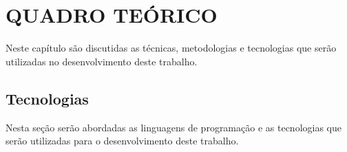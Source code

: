 \chapter{QUADRO TEÓRICO}

\par Neste capítulo são discutidas as técnicas, metodologias e tecnologias que serão utilizadas no desenvolvimento deste trabalho.






\section{Tecnologias}

\par Nesta seção serão abordadas as linguagens de programação e as tecnologias que serão utilizadas para o desenvolvimento deste trabalho.



%





















